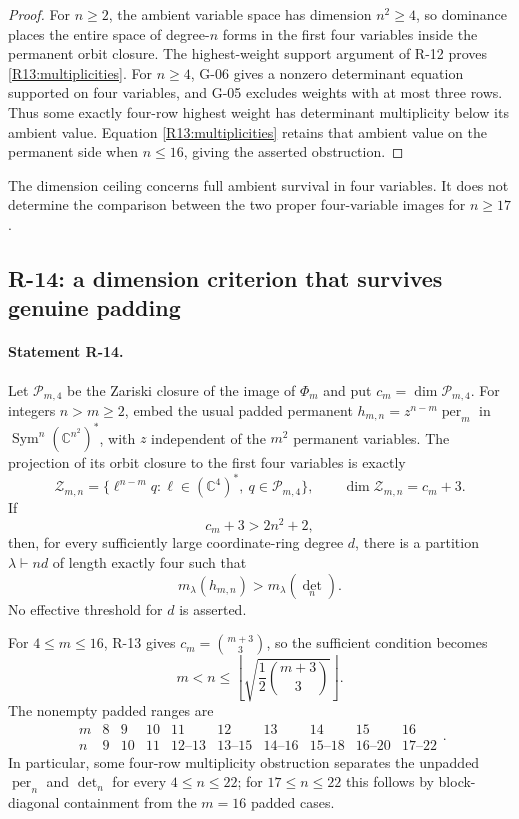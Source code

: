 \documentclass[11pt,a4paper]{article}
\theoremstyle{definition}\newtheorem{definition}{Definition}
\begin{document}
\begin{proof}
For $n\geq2$, the ambient variable space has dimension $n^2\geq4$,
so dominance places the entire space of degree-$n$ forms in the
first four variables inside the permanent orbit closure. The
highest-weight support argument of R-12 proves
\eqref{R13:multiplicities}.
For $n\geq4$, G-06 gives a nonzero determinant equation supported
on four variables, and G-05 excludes weights with at most three
rows. Thus some exactly four-row highest weight has determinant
multiplicity below its ambient value. Equation
\eqref{R13:multiplicities} retains that ambient value on the
permanent side when $n\leq16$, giving the asserted obstruction.
\end{proof}

The dimension ceiling concerns full ambient survival in four
variables. It does not determine the comparison between the two
proper four-variable images for $n\geq17$.

\subsection{R-14: a dimension criterion that survives genuine padding}

\paragraph{Statement R-14.}
Let $\mathcal P_{m,4}$ be the Zariski closure of the image of
$\Phi_m$ and put $c_m=\dim\mathcal P_{m,4}$.
For integers $n>m\geq2$, embed the usual padded permanent
$h_{m,n}=z^{n-m}\operatorname{per}_m$ in
$\operatorname{Sym}^n(\mathbb C^{n^2})^*$, with $z$ independent
of the $m^2$ permanent variables. The projection of its orbit
closure to the first four variables is exactly
\begin{equation}\label{R14:paddingvariety}
 \mathcal Z_{m,n}=
 \{\ell^{n-m}q:\ell\in(\mathbb C^4)^*,\ q\in\mathcal P_{m,4}\},
 \qquad \dim\mathcal Z_{m,n}=c_m+3.
\end{equation}
If
\begin{equation}\label{R14:criterion}
 c_m+3>2n^2+2,
\end{equation}
then, for every sufficiently large coordinate-ring degree $d$,
there is a partition $\lambda\vdash nd$ of length exactly four
such that
\[
 m_\lambda(h_{m,n})>m_\lambda(\det_n).
\]
No effective threshold for $d$ is asserted.

For $4\leq m\leq16$, R-13 gives $c_m=\binom{m+3}{3}$, so the
sufficient condition becomes
\begin{equation}\label{R14:explicitrange}
 m<n\leq\left\lfloor\sqrt{\frac12\binom{m+3}{3}}\right\rfloor.
\end{equation}
The nonempty padded ranges are
\[
\begin{array}{c|ccccccccc}
m&8&9&10&11&12&13&14&15&16\\\hline
n&9&10&11&12\text{--}13&13\text{--}15&14\text{--}16&
15\text{--}18&16\text{--}20&17\text{--}22
\end{array}.
\]
In particular, some four-row multiplicity obstruction separates
the unpadded $\operatorname{per}_n$ and $\det_n$ for every
$4\leq n\leq22$; for $17\leq n\leq22$ this follows by
block-diagonal containment from the $m=16$ padded cases.
\end{document}
